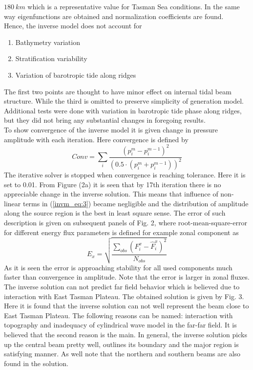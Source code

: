 \documentclass[12pt]{article}
\begin{document}
$180~km$ which is a representative value for Tasman Sea conditions. In the same way eigenfunctions 
are obtained and normalization coefficients are found.\\
Hence, the inverse model does not account for
\begin{enumerate}
\item Bathymetry variation
\item Stratification variability
\item Variation of barotropic tide along ridges
\end{enumerate}
The first two points are thought to have minor effect on internal tidal beam structure. While the 
third is omitted to preserve simplicity of generation model. Additional tests were done with 
variation in barotropic tide phase along ridges, but they did not bring any substantial changes in 
foregoing results.\\
To show convergence of the inverse model it is given change in pressure amplitude with each 
iteration. Here convergence is defined by
\begin{equation*}
Conv = \sum_i \frac{(p_i^m - p_i^{m-1})^2}{(0.5 \cdot (p_i^m + p_i^{m-1}))^2}
\end{equation*}
The iterative solver is stopped when convergence is reaching tolerance. Here it is set to 0.01. 
From Figure (2a) it is seen that by 17th iteration there is no appreciable change in the inverse 
solution. This means that influence of non-linear terms in (\ref{invm_eq:3}) became negligible and 
the distribution of amplitude along the source region is the best in least square sense. The error 
of such description is given on subsequent panels of Fig. 2, where root-mean-square-error for 
different energy flux parameters is defined for example zonal component as
\begin{equation}
E_{x} = \sqrt{\frac{\sum_{obs} (F_i^x - \hat{F}_i^x)^2}{N_{obs}}}
\end{equation}
As it is seen the error is approaching stability for all used components much faster than 
convergence in amplitude. Note that the error is larger in zonal fluxes. The inverse solution can 
not predict far field behavior which is believed due to interaction with East Tasman Plateau. The 
obtained solution is given by Fig. 3. Here it is found that the inverse solution can not well 
represent the beam close to East Tasman Plateau. The following reasons can be named: interaction 
with topography and inadequacy of cylindrical wave model in the far-far field. It is believed that 
the second reason is the main. In general, the inverse solution picks up the central beam pretty 
well, outlines its boundary and the major region is satisfying manner. As well note that the 
northern and southern beams are also found in the solution.
\end{document}
